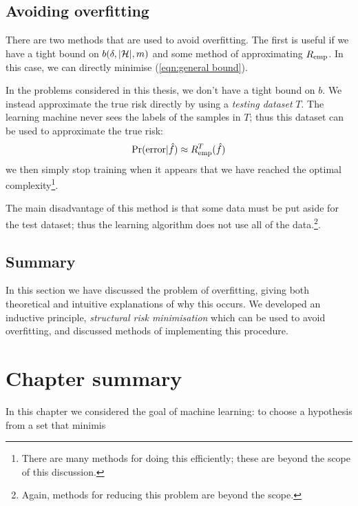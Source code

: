 \subsection{Avoiding overfitting}

There are two methods that are used to avoid overfitting.  The first
is useful if we have a tight bound on $b(\delta, |\mathcal{H}|, m)$ and some
method of approximating $R_{\mathrm{emp}}$.  In this case, we can directly
minimise (\ref{eqn:general bound}).

In the problems considered in this thesis, we don't have a tight bound
on $b$.  We instead 
approximate the true risk directly by using a \emph{testing dataset}
$T$.  The learning machine never sees the labels of the samples in
$T$; thus this dataset can be used to approximate the true risk:
%
\begin{equation}
\Pr(\mathrm{error}|\hat{f}) \approx R_{\mathrm{emp}}^{T}(\hat{f})
\end{equation}
%
we then simply stop training when it appears that we have reached the
optimal complexity\footnote{There are many methods for doing this efficiently;
these are beyond the scope of this discussion.}.

The main disadvantage of this method is that some data must be put
aside for the test dataset; thus the learning algorithm does not use
all of the data.\footnote{Again, methods for reducing this problem are
beyond the scope.}.

\subsection{Summary}

In this section we have discussed the problem of overfitting, giving
both theoretical and intuitive explanations of why this occurs.  We
developed an inductive principle, \emph{structural risk minimisation}
which can be used to avoid overfitting, and discussed methods of
implementing this procedure.

\section{Chapter summary}

In this chapter we considered the goal of machine learning: to choose
a hypothesis from a set that minimis
